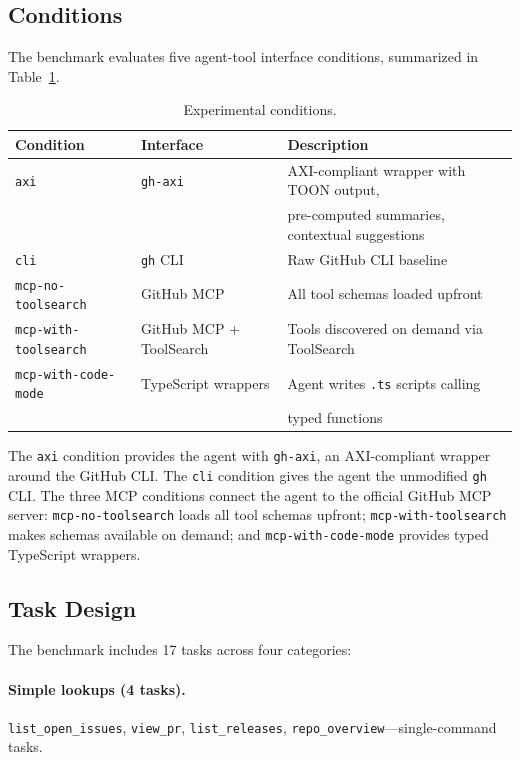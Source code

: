 \documentclass{article}
\begin{document}
\subsection{Conditions}

The benchmark evaluates five agent-tool interface conditions, summarized in
Table~\ref{tab:conditions}.

\begin{table}[t]
\centering
\caption{Experimental conditions.}
\label{tab:conditions}
\begin{tabular}{@{}lll@{}}
\toprule
Condition & Interface & Description \\
\midrule
\texttt{axi} & \texttt{gh-axi} & AXI-compliant wrapper with TOON output, \\
  & & pre-computed summaries, contextual suggestions \\
\texttt{cli} & \texttt{gh} CLI & Raw GitHub CLI baseline \\
\texttt{mcp-no-toolsearch} & GitHub MCP & All tool schemas loaded upfront \\
\texttt{mcp-with-toolsearch} & GitHub MCP + ToolSearch & Tools discovered on demand via ToolSearch \\
\texttt{mcp-with-code-mode} & TypeScript wrappers & Agent writes \texttt{.ts} scripts calling \\
  & & typed functions \\
\bottomrule
\end{tabular}
\end{table}

The \texttt{axi} condition provides the agent with \texttt{gh-axi}, an
AXI-compliant wrapper around the GitHub CLI. The \texttt{cli} condition gives
the agent the unmodified \texttt{gh} CLI. The three MCP conditions connect the
agent to the official GitHub MCP server: \texttt{mcp-no-toolsearch} loads all
tool schemas upfront; \texttt{mcp-with-toolsearch} makes schemas available on
demand; and \texttt{mcp-with-code-mode} provides typed TypeScript wrappers.

\subsection{Task Design}

The benchmark includes 17 tasks across four categories:

\paragraph{Simple lookups (4 tasks).}
\texttt{list\_open\_issues}, \texttt{view\_pr}, \texttt{list\_releases},
\texttt{repo\_overview}---single-command tasks.
\end{document}
